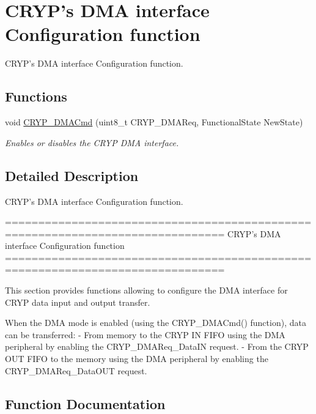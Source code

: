 \hypertarget{group___c_r_y_p___group4}{}\section{C\+R\+Y\+P's D\+M\+A interface Configuration function}
\label{group___c_r_y_p___group4}


C\+R\+Y\+P's D\+M\+A interface Configuration function.  


\subsection*{Functions}
\begin{DoxyCompactItemize}
\item 
void \hyperlink{group___c_r_y_p___group4_ga111d0ec56facb27f8367ce6a33869115}{C\+R\+Y\+P\+\_\+\+D\+M\+A\+Cmd} (uint8\+\_\+t C\+R\+Y\+P\+\_\+\+D\+M\+A\+Req, Functional\+State New\+State)
\begin{DoxyCompactList}\small\item\em Enables or disables the C\+R\+Y\+P D\+M\+A interface. \end{DoxyCompactList}\end{DoxyCompactItemize}


\subsection{Detailed Description}
C\+R\+Y\+P's D\+M\+A interface Configuration function. 

\begin{DoxyVerb} ===============================================================================
                   CRYP's DMA interface Configuration function
 ===============================================================================  

  This section provides functions allowing to configure the DMA interface for 
  CRYP data input and output transfer.
   
  When the DMA mode is enabled (using the CRYP_DMACmd() function), data can be 
  transferred:
  - From memory to the CRYP IN FIFO using the DMA peripheral by enabling 
    the CRYP_DMAReq_DataIN request.
  - From the CRYP OUT FIFO to the memory using the DMA peripheral by enabling 
    the CRYP_DMAReq_DataOUT request.\end{DoxyVerb}
 

\subsection{Function Documentation}
\hypertarget{group___c_r_y_p___group4_ga111d0ec56facb27f8367ce6a33869115}{}
